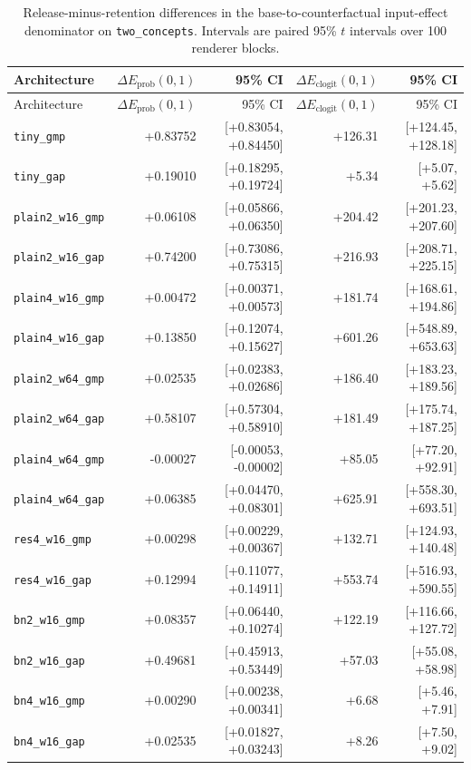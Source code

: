{\scriptsize
\setlength{\tabcolsep}{2.5pt}
\begin{longtable}{lrrrr}
\caption{Release-minus-retention differences in the base-to-counterfactual input-effect denominator on \texttt{two\_concepts}. Intervals are paired 95\% $t$ intervals over 100 renderer blocks.}\label{tab:architecture-denominators}\\
\toprule
Architecture & $\Delta E_{\mathrm{prob}}(0,1)$ & 95\% CI & $\Delta E_{\mathrm{clogit}}(0,1)$ & 95\% CI \\
\midrule
\endfirsthead
\toprule
Architecture & $\Delta E_{\mathrm{prob}}(0,1)$ & 95\% CI & $\Delta E_{\mathrm{clogit}}(0,1)$ & 95\% CI \\
\midrule
\endhead
\bottomrule
\endfoot
\texttt{tiny\_gmp} & +0.83752 & [+0.83054, +0.84450] & +126.31 & [+124.45, +128.18] \\
\texttt{tiny\_gap} & +0.19010 & [+0.18295, +0.19724] & +5.34 & [+5.07, +5.62] \\
\texttt{plain2\_w16\_gmp} & +0.06108 & [+0.05866, +0.06350] & +204.42 & [+201.23, +207.60] \\
\texttt{plain2\_w16\_gap} & +0.74200 & [+0.73086, +0.75315] & +216.93 & [+208.71, +225.15] \\
\texttt{plain4\_w16\_gmp} & +0.00472 & [+0.00371, +0.00573] & +181.74 & [+168.61, +194.86] \\
\texttt{plain4\_w16\_gap} & +0.13850 & [+0.12074, +0.15627] & +601.26 & [+548.89, +653.63] \\
\texttt{plain2\_w64\_gmp} & +0.02535 & [+0.02383, +0.02686] & +186.40 & [+183.23, +189.56] \\
\texttt{plain2\_w64\_gap} & +0.58107 & [+0.57304, +0.58910] & +181.49 & [+175.74, +187.25] \\
\texttt{plain4\_w64\_gmp} & -0.00027 & [-0.00053, -0.00002] & +85.05 & [+77.20, +92.91] \\
\texttt{plain4\_w64\_gap} & +0.06385 & [+0.04470, +0.08301] & +625.91 & [+558.30, +693.51] \\
\texttt{res4\_w16\_gmp} & +0.00298 & [+0.00229, +0.00367] & +132.71 & [+124.93, +140.48] \\
\texttt{res4\_w16\_gap} & +0.12994 & [+0.11077, +0.14911] & +553.74 & [+516.93, +590.55] \\
\texttt{bn2\_w16\_gmp} & +0.08357 & [+0.06440, +0.10274] & +122.19 & [+116.66, +127.72] \\
\texttt{bn2\_w16\_gap} & +0.49681 & [+0.45913, +0.53449] & +57.03 & [+55.08, +58.98] \\
\texttt{bn4\_w16\_gmp} & +0.00290 & [+0.00238, +0.00341] & +6.68 & [+5.46, +7.91] \\
\texttt{bn4\_w16\_gap} & +0.02535 & [+0.01827, +0.03243] & +8.26 & [+7.50, +9.02] \\
\end{longtable}
\normalsize
}

